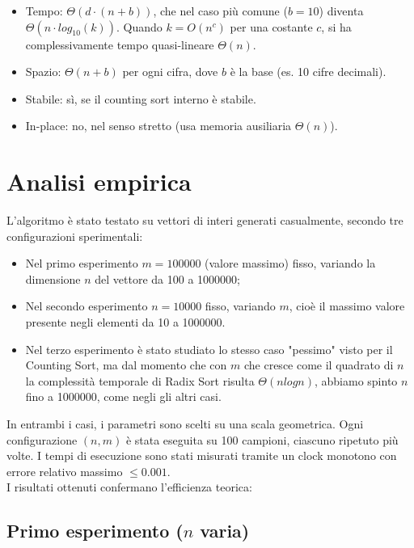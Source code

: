 \documentclass[a4paper, 12pt, oneside]{book}
\begin{document}
\begin{itemize}
    \item Tempo: \(\Theta(d \cdot (n + b))\), che nel caso più comune (\(b = 10\)) diventa \(\Theta(n \cdot log_{10}(k))\). Quando \(k = O(n^c)\) per una costante \(c\), si ha complessivamente tempo quasi-lineare \(\Theta(n)\).
    \item Spazio: \(\Theta(n + b)\) per ogni cifra, dove \(b\) è la base (es. 10 cifre decimali).
    \item Stabile: sì, se il counting sort interno è stabile.
    \item In-place: no, nel senso stretto (usa memoria ausiliaria \(\Theta(n)\)).
\end{itemize}

\section{Analisi empirica}

L'algoritmo è stato testato su vettori di interi generati casualmente, secondo tre configurazioni sperimentali:

\begin{itemize}
    \item Nel primo esperimento \(m = 100000\) (valore massimo) fisso, variando la dimensione \(n\) del vettore da 100 a 1000000;
    \item Nel secondo esperimento \(n = 10000\) fisso, variando \(m\), cioè il massimo valore presente negli elementi da 10 a 1000000.
    \item Nel terzo esperimento è stato studiato lo stesso caso "pessimo" visto per il Counting Sort, ma dal momento che con \(m\) che cresce come il quadrato di \(n\) la complessità temporale di Radix Sort risulta \(\Theta(nlogn)\), abbiamo spinto \(n\) fino a 1000000, come negli gli altri casi.
\end{itemize}

\noindent In entrambi i casi, i parametri sono scelti su una scala geometrica. Ogni configurazione \((n, m)\) è stata eseguita su 100 campioni, ciascuno ripetuto più volte. I tempi di esecuzione sono stati misurati tramite un clock monotono con errore relativo massimo \(\leq 0.001\). \\

\noindent I risultati ottenuti confermano l'efficienza teorica:

\subsection{Primo esperimento ($n$ varia)}
\end{document}
